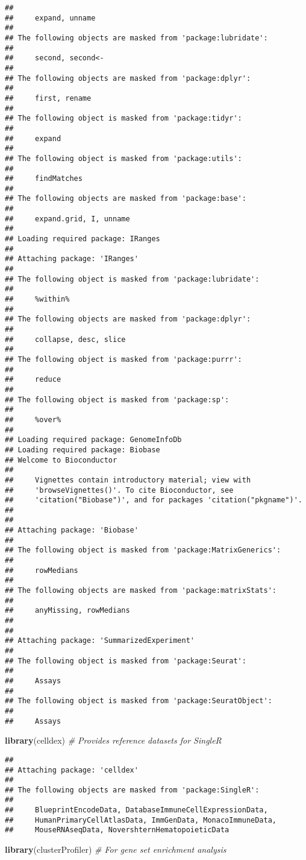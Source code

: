 \documentclass[
]{article}
\newenvironment{Shaded}{\begin{snugshade}}{\end{snugshade}}
\newcommand{\CommentTok}[1]{\textcolor[rgb]{0.56,0.35,0.01}{\textit{#1}}}
\newcommand{\FunctionTok}[1]{\textcolor[rgb]{0.13,0.29,0.53}{\textbf{#1}}}
\newcommand{\NormalTok}[1]{#1}
\begin{document}
\begin{verbatim}
## 
##     expand, unname
## 
## The following objects are masked from 'package:lubridate':
## 
##     second, second<-
## 
## The following objects are masked from 'package:dplyr':
## 
##     first, rename
## 
## The following object is masked from 'package:tidyr':
## 
##     expand
## 
## The following object is masked from 'package:utils':
## 
##     findMatches
## 
## The following objects are masked from 'package:base':
## 
##     expand.grid, I, unname
## 
## Loading required package: IRanges
## 
## Attaching package: 'IRanges'
## 
## The following object is masked from 'package:lubridate':
## 
##     %within%
## 
## The following objects are masked from 'package:dplyr':
## 
##     collapse, desc, slice
## 
## The following object is masked from 'package:purrr':
## 
##     reduce
## 
## The following object is masked from 'package:sp':
## 
##     %over%
## 
## Loading required package: GenomeInfoDb
## Loading required package: Biobase
## Welcome to Bioconductor
## 
##     Vignettes contain introductory material; view with
##     'browseVignettes()'. To cite Bioconductor, see
##     'citation("Biobase")', and for packages 'citation("pkgname")'.
## 
## 
## Attaching package: 'Biobase'
## 
## The following object is masked from 'package:MatrixGenerics':
## 
##     rowMedians
## 
## The following objects are masked from 'package:matrixStats':
## 
##     anyMissing, rowMedians
## 
## 
## Attaching package: 'SummarizedExperiment'
## 
## The following object is masked from 'package:Seurat':
## 
##     Assays
## 
## The following object is masked from 'package:SeuratObject':
## 
##     Assays
\end{verbatim}

\begin{Shaded}
\begin{Highlighting}[]
\FunctionTok{library}\NormalTok{(celldex)        }\CommentTok{\# Provides reference datasets for SingleR}
\end{Highlighting}
\end{Shaded}

\begin{verbatim}
## 
## Attaching package: 'celldex'
## 
## The following objects are masked from 'package:SingleR':
## 
##     BlueprintEncodeData, DatabaseImmuneCellExpressionData,
##     HumanPrimaryCellAtlasData, ImmGenData, MonacoImmuneData,
##     MouseRNAseqData, NovershternHematopoieticData
\end{verbatim}

\begin{Shaded}
\begin{Highlighting}[]
\FunctionTok{library}\NormalTok{(clusterProfiler) }\CommentTok{\# For gene set enrichment analysis}
\end{Highlighting}
\end{Shaded}
\end{document}
